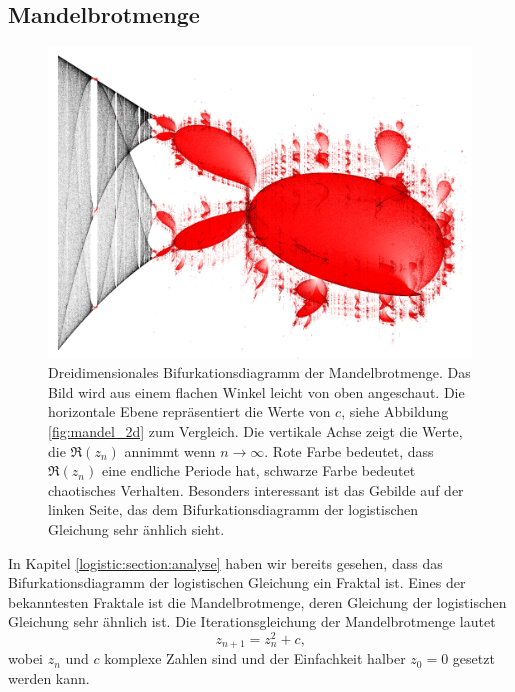 \subsection{Mandelbrotmenge}
%
\begin{figure}
    \includegraphics[width=\linewidth]{papers/logistic/figures/mandel_3d.png}
    \caption{
        Dreidimensionales Bifurkationsdiagramm der Mandelbrotmenge.
        Das Bild wird aus einem flachen Winkel 
        leicht von oben angeschaut. 
        Die horizontale Ebene repräsentiert die
        Werte von $c$, siehe Abbildung \ref{fig:mandel_2d}
        zum Vergleich.
        Die vertikale Achse zeigt
        die Werte, die $\Re(z_n)$ annimmt wenn 
        $n \rightarrow \infty$.
        Rote Farbe bedeutet, dass $\Re(z_n)$ eine
        endliche Periode hat, schwarze Farbe bedeutet
        chaotisches Verhalten. 
        Besonders interessant ist das Gebilde auf der 
        linken Seite, das dem Bifurkationsdiagramm
        der logistischen Gleichung sehr änhlich sieht.
    }
    \label{fig:mandel_3d}
\end{figure}
In Kapitel \ref{logistic:section:analyse} 
haben wir bereits gesehen, 
dass das Bifurkationsdiagramm der logistischen Gleichung
ein Fraktal ist. 
Eines der bekanntesten Fraktale ist die Mandelbrotmenge,
deren Gleichung der logistischen Gleichung sehr ähnlich ist. 
Die Iterationsgleichung der Mandelbrotmenge lautet
\begin{equation}
    z_{n+1} = z_n^2 + c\text{,}
    \label{eq:mandelbrot}
\end{equation}
wobei $z_n$ und $c$ komplexe Zahlen sind und 
der Einfachkeit halber $z_0 = 0$ gesetzt werden kann.
